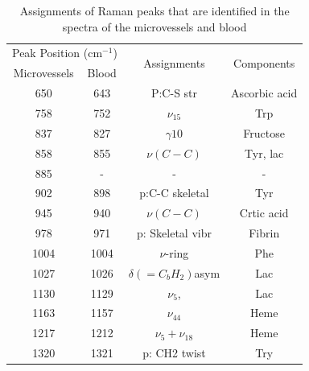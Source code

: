 \begin{table}[]
\caption{Assignments of Raman peaks that are identified in the spectra of the microvessels and blood \citep{peak45,forearm2005,peak47,peak48}}
\begin{center}
\begin{tabular}{cccc}
\hline
\multicolumn{2}{l}{Peak Position ($\text{cm}^{-1}$)} & \multirow{2}{*}{Assignments}  & \multirow{2}{*}{Components} \\ \cline{1-2}
Microvessels         & Blood         &                               &                             \\ \cline{1-2}
\hline
650                  & 643           & P:C-S str                     & Ascorbic acid               \\
758                  & 752           & $\nu_{15}$                    & Trp                         \\
837                  & 827           & $\gamma10$                    & Fructose                    \\
858                  & 855           & $\nu(C-C)$                    & Tyr, lac                    \\
885                  & -             & -                             & -                           \\
902                  & 898           & p:C-C skeletal                & Tyr                         \\
945                  & 940           & $\nu(C-C)$                    & Crtic acid                  \\
978                  & 971           & p: Skeletal vibr              & Fibrin                      \\
1004                 & 1004          & $\nu$-ring                    & Phe                         \\
1027                 & 1026          & $\delta(={C}_{b}{H}_{2})$asym & Lac                         \\
1130                 & 1129          & $\nu_5$,                      & Lac                         \\
1163                 & 1157          & $\nu_{44}$                    & Heme                        \\
1217                 & 1212          & $\nu_5 + \nu_{18}$            & Heme                        \\
1320                 & 1321          & p: CH2 twist                  & Try                         \\

\end{tabular}
\end{center}
\end{table}
